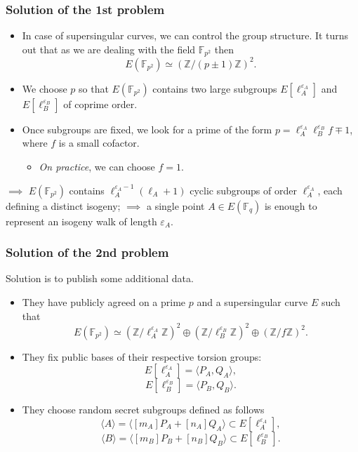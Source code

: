 \documentclass{beamer}
\begin{document}
\begin{frame}
\frametitle{Solution of the 1st problem}

	\begin{itemize}
		\item In case of \alert{supersingular} curves, we can control the group structure. It turns out that as we are dealing with the field $\mathbb{F}_{p^2}$ then
			\[ E(\mathbb{F}_{p^2}) \simeq (\mathbb{Z}/(p \pm 1)\mathbb{Z})^2. \]
			
		\item We choose $p$ so that $E(\mathbb{F}_{p^2})$ contains two large subgroups $E[\ell_A^{\varepsilon_A}]$ and $E[\ell_B^{\varepsilon_B}]$ of coprime order.
		
		\item Once subgroups are fixed, we look for a prime of the form $p = \ell_A^{\varepsilon_A} \ell_B^{\varepsilon_B}f \mp 1$, where $f$ is a small cofactor.
			\begin{itemize}
				\item \emph{On practice}, we can choose $f = 1$.
			\end{itemize}
	\end{itemize}
	$\implies$ $E(\mathbb{F}_{p^2})$ contains $\ell_A^{\varepsilon_A - 1}(\ell_A + 1)$  cyclic subgroups of order $\ell_A^{\varepsilon_A}$, each defining a distinct isogeny; $\implies$ a single point $A \in E(\mathbb{F}_q)$ is enough to represent an isogeny walk of length $\varepsilon_A$.
	
\end{frame}

\begin{frame}
\frametitle{Solution of the 2nd problem}
	Solution is to publish some additional data.
	
	\begin{itemize}
		\item They have publicly agreed on a prime $p$ and a supersingular curve $E$ such that
			\[ E(\mathbb{F}_{p^2}) \simeq (\mathbb{Z}/\ell_A^{\varepsilon_A}\mathbb{Z})^2 \oplus (\mathbb{Z}/\ell_B^{\varepsilon_B}\mathbb{Z})^2 \oplus (\mathbb{Z}/f\mathbb{Z})^2. \]
		
		\item They fix public bases of their respective torsion groups:
		\[ E[\ell_A^{\varepsilon_A}] = \langle P_A, Q_A \rangle, \]
		\[ E[\ell_B^{\varepsilon_B}] = \langle P_B, Q_B \rangle. \]
		
		\item They choose random secret subgroups defined as follows
		\[ \langle A \rangle = \langle [m_A]P_A + [n_A]Q_A \rangle \subset E[\ell_A^{\varepsilon_A}], \]
		\[ \langle B \rangle = \langle [m_B]P_B +[n_B]Q_B \rangle \subset E[\ell_B^{\varepsilon_B}]. \]
		
		
	\end{itemize}

\end{frame}
\end{document}
